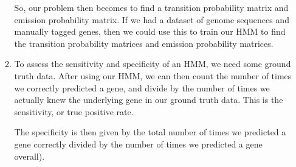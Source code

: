 \begin{enumerate}[label=(\alph*)]
\begin{enumerate}[label=(\roman*)]
        So, our problem then becomes to find a transition probability matrix and emission probability matrix. If we had a dataset of genome sequences and manually tagged genes, then we could use this to train our HMM to find the transition probability matrices and emission probability matrices.

      \item
        To assess the sensitivity and specificity of an HMM, we need some ground truth data. After using our HMM, we can then count the number of times we correctly predicted a gene, and divide by the number of times we actually knew the underlying gene in our ground truth data. This is the sensitivity, or true positive rate.

        The specificity is then given by the total number of times we predicted a gene correctly divided by the number of times we predicted a gene overall).
        
    \end{enumerate}



        
    \end{enumerate}

